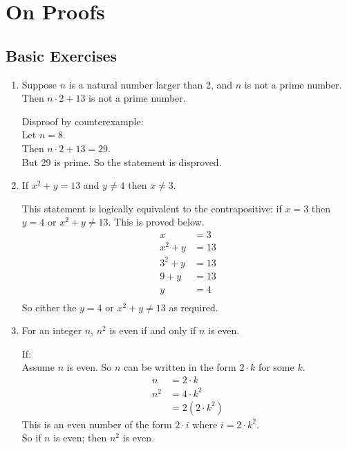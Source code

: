 \documentclass[10pt,\jkfside,a4paper]{article}
\begin{document}
\section{On Proofs}

\subsection{Basic Exercises}

\begin{enumerate}

\item Suppose $n$ is a natural number larger than 2, and $n$ is not a prime number. 
Then $n \cdot 2 + 13$ is not a prime number.

Disproof by counterexample:\\
Let $n = 8$. \\
Then $n \cdot 2 + 13 = 29$. \\
But 29 is prime.
So the statement is disproved.

\item If $x^2 + y = 13$ and $y \neq 4$ then $x \neq 3$.

This statement is logically equivalent to the contrapositive: if $x = 3$ then 
$y = 4$ or $x^2 + y \neq 13$.
This is proved below.
\begin{equation}
\begin{split}
x &= 3\\
x^2 + y &= 13\\
3^2 + y &= 13\\
9 + y &= 13\\
y &= 4\\
\end{split}
\end{equation}
So either the $y = 4$ or $x^2 + y \neq 13$ as required.

\item For an integer $n$, $n^2$ is even if and only if $n$ is even.

If:\\
Assume $n$ is even. So $n$ can be written in the form $2\cdot k$ for some $k$. 
\begin{equation}
\begin{split}
n &= 2\cdot k\\
n^2 &= 4\cdot k^2\\ 
&= 2(2\cdot k^2)
\end{split}
\end{equation}
This is an even number of the form $2\cdot i$ where $i = 2\cdot k^2$.\\
So if $n$ is even; then $n^2$ is even.


\end{enumerate}
\end{document}
